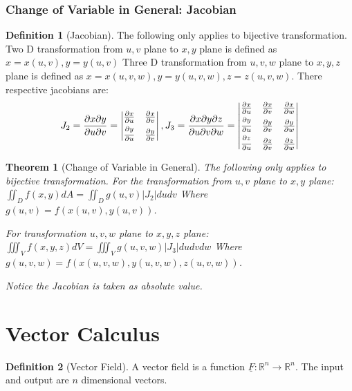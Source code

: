 \documentclass[9pt]{article}
\newtheorem{theorem}{Theorem}[subsection]
\theoremstyle{definition}
\newtheorem{definition}{Definition}[section]
\theoremstyle{remark}
\begin{document}
\subsubsection{Change of Variable in General: Jacobian}
\begin{definition}[Jacobian]
The following only applies to bijective transformation.
Two D transformation from $u,v$ plane to $x,y$ plane is defined as $x = x(u,v), y = y(u, v)$
Three D transformation from $u,v,w$ plane to $x,y,z$ plane is defined as $x=x(u,v,w), y = y(u,v,w), z = z(u,v,w)$. There respective jacobians are:
	\[
		J_2 = \frac{\partial x \partial y}{\partial u \partial v} 
		=\begin{vmatrix}
			\frac{\partial x}{\partial u} & \frac{\partial x}{\partial v} \\
			\frac{\strut\partial y}{\partial u} & \frac{\partial y}{\partial v}
		\end{vmatrix}
,
	J_3 = \frac{\partial x \partial y \partial z}{\partial u \partial v \partial w}
=	\begin{vmatrix}
		\frac{\partial x}{\partial u} & \frac{\partial x}{\partial v} & \frac{\partial x}{\partial w} \\
		\frac{\strut\partial y}{\partial u} & \frac{\partial y}{\partial v} & \frac{\partial y}{\partial w} \\
		\frac{\strut\partial z}{\partial u} & \frac{\partial z}{\partial v} & \frac{\partial z}{\partial w}
	\end{vmatrix}
	\]
\end{definition}

\begin{theorem}[Change of Variable in General]
The following only applies to bijective transformation.
	For the transformation from $u,v$ plane to $x,y$ plane:
$
	\iint_D f(x,y) dA = \iint_D g(u,v) |J_2| du dv
$
Where $g(u,v) = f(x(u,v), y(u,v))$.

For transformation $u,v,w$ plane to $x,y,z$ plane:
$
	\iiint_V f(x,y,z) dV = \iiint_V g(u,v,w) |J_3| du dv dw
$
Where $g(u,v,w) = f(x(u,v,w), y(u,v,w), z(u,v,w))$.

Notice the Jacobian is taken as absolute value.
\end{theorem}

\section{Vector Calculus}

\begin{definition}[Vector Field]
A vector field is a function 
$\underline{F}: \mathbb{R}^n \rightarrow \mathbb{R}^n$.
The input and output are $n$ dimensional vectors.
\end{definition}
\end{document}
